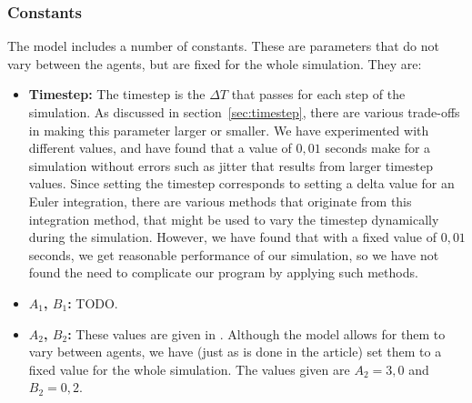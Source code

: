 \subsubsection{Constants}
The model includes a number of constants. These are parameters that do not 
vary between the agents, but are fixed for the whole simulation. They are:

\begin{itemize}
    \item \textbf{Timestep:} The timestep is the $\Delta T$ that passes for 
        each step of the simulation. As discussed in 
        section~\ref{sec:timestep}, there are various trade-offs in making 
        this parameter larger or smaller. We have experimented with different 
        values, and have found that a value of $0,01$ seconds make for a 
        simulation without errors such as jitter that results from larger 
        timestep values. Since setting the timestep corresponds to setting a 
        delta value for an Euler integration, there are various methods that 
        originate from this integration method, that might be used to vary the 
        timestep dynamically during the simulation. However, we have found 
        that with a fixed value of $0,01$ seconds, we get reasonable 
        performance of our simulation, so we have not found the need to 
        complicate our program by applying such methods.

    \item \textbf{$A_1$, $B_1$:} TODO.

    \item \textbf{$A_2$, $B_2$:} These values are given in \cite{helbing00}. 
        Although the model allows for them to vary between agents, we have 
        (just as is done in the article) set them to a fixed value for the 
        whole simulation. The values given are $A_2=3,0$ and $B_2 = 0,2$.
\end{itemize}



